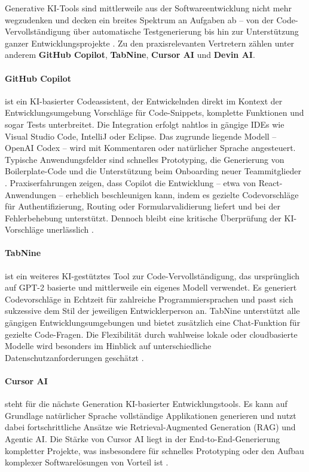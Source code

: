 
Generative KI-Tools sind mittlerweile aus der Softwareentwicklung nicht mehr
wegzudenken und decken ein breites Spektrum an Aufgaben ab – von der
Code-Vervollständigung über automatische Testgenerierung bis hin zur
Unterstützung ganzer Entwicklungsprojekte \cite{donvir_role_2024}. Zu den
praxisrelevanten Vertretern zählen unter anderem \textbf{GitHub Copilot},
\textbf{TabNine}, \textbf{Cursor AI} und \textbf{Devin AI}.

\paragraph{GitHub Copilot}
ist ein KI-basierter Codeassistent, der Entwickelnden direkt im Kontext der
Entwicklungsumgebung Vorschläge für Code-Snippets, komplette Funktionen und
sogar Tests unterbreitet. Die Integration erfolgt nahtlos in gängige IDEs wie
Visual Studio Code, IntelliJ oder Eclipse. Das zugrunde liegende Modell –
OpenAI Codex – wird mit Kommentaren oder natürlicher Sprache angesteuert.
Typische Anwendungsfelder sind schnelles Prototyping, die Generierung von
Boilerplate-Code und die Unterstützung beim Onboarding neuer Teammitglieder
\cite{donvir_role_2024}. Praxiserfahrungen zeigen, dass Copilot die Entwicklung
– etwa von React-Anwendungen – erheblich beschleunigen kann, indem es gezielte
Codevorschläge für Authentifizierung, Routing oder Formularvalidierung liefert
und bei der Fehlerbehebung unterstützt. Dennoch bleibt eine kritische
Überprüfung der KI-Vorschläge unerlässlich \cite{kerr_github_nodate}.

\paragraph{TabNine}
ist ein weiteres KI-gestütztes Tool zur Code-Vervollständigung, das
ursprünglich auf GPT-2 basierte und mittlerweile ein eigenes Modell verwendet.
Es generiert Codevorschläge in Echtzeit für zahlreiche Programmiersprachen und
passt sich sukzessive dem Stil der jeweiligen Entwicklerperson an. TabNine
unterstützt alle gängigen Entwicklungsumgebungen und bietet zusätzlich eine
Chat-Funktion für gezielte Code-Fragen. Die Flexibilität durch wahlweise lokale
oder cloudbasierte Modelle wird besonders im Hinblick auf unterschiedliche
Datenschutzanforderungen geschätzt \cite{donvir_role_2024}.

\paragraph{Cursor AI}
steht für die nächste Generation KI-basierter Entwicklungstools. Es kann auf
Grundlage natürlicher Sprache vollständige Applikationen generieren und nutzt
dabei fortschrittliche Ansätze wie Retrieval-Augmented Generation (RAG) und
Agentic AI. Die Stärke von Cursor AI liegt in der End-to-End-Generierung
kompletter Projekte, was insbesondere für schnelles Prototyping oder den Aufbau
komplexer Softwarelösungen von Vorteil ist \cite{donvir_role_2024}.

